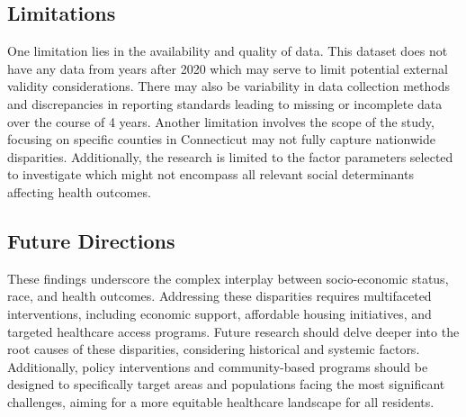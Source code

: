 \documentclass[12pt]{article}
\begin{document}
\subsection{Limitations}
One limitation lies in the availability and quality of data. This dataset does not have any 
data from years after 2020 which may serve to limit potential external validity considerations. 
There may also be variability in data collection methods and discrepancies in reporting standards 
leading to missing or incomplete data over the course of 4 years. Another limitation involves the scope 
of the study, focusing on specific counties in Connecticut may not fully capture nationwide disparities. 
Additionally, the research is limited to the factor parameters selected to investigate which  might not 
encompass all relevant social determinants affecting health outcomes.

\subsection{Future Directions}
These findings underscore the complex interplay between socio-economic status, race, and health outcomes. 
Addressing these disparities requires multifaceted interventions, including economic support, affordable 
housing initiatives, and targeted healthcare access programs. Future research should delve deeper into the 
root causes of these disparities, considering historical and systemic factors. Additionally, policy interventions 
and community-based programs should be designed to specifically target areas and populations facing the most 
significant challenges, aiming for a more equitable healthcare landscape for all residents.


\appendix



\end{document}

